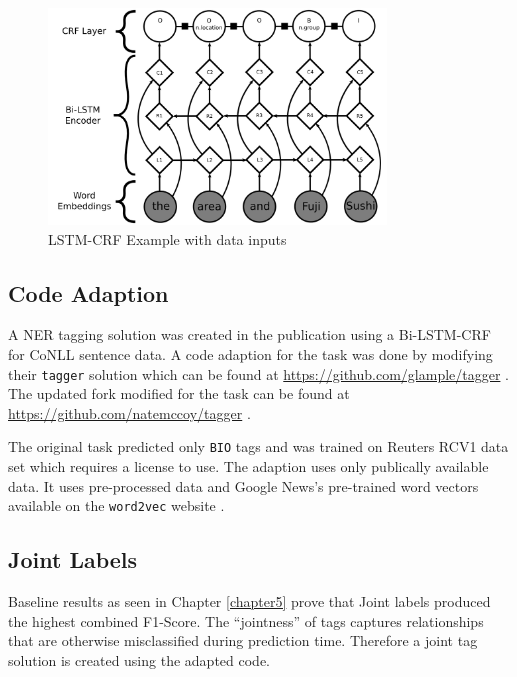 \begin{figure}[H]
\centering
\includegraphics[width=0.8\textwidth]{images/LSTM_CRF_inkscape.png}
\caption{LSTM-CRF Example with \dimsum data inputs}
\label{fig:lstmcrfexampledimsumdata}
\end{figure}

\subsection{Code Adaption}

A NER tagging solution was created in the publication \cite{Lample2016} using a Bi-LSTM-CRF for CoNLL sentence data. A code adaption for the \dimsum task was done by modifying their \texttt{tagger} solution which can be found at {\url{https://github.com/glample/tagger}} \cite{githubglampletagger}. The updated fork modified for the \dimsum task can be found at {\url{https://github.com/natemccoy/tagger}} \cite{githubnatemccoytagger}.

The original task predicted only \texttt{BIO} tags and was trained on Reuters RCV1 data set which requires a license to use. The adaption uses only publically available data. It uses pre-processed \dimsum data \cite{dimsum16webdata} and Google News's pre-trained word vectors available on the \texttt{word2vec} website \cite{word2vecgooglecodeweb}.

\subsection{Joint Labels}

Baseline results as seen in Chapter \ref{chapter5} prove that Joint labels produced the highest combined F1-Score. The ``jointness'' of tags captures relationships that are otherwise misclassified during prediction time. Therefore a joint tag solution is created using the adapted code. 

